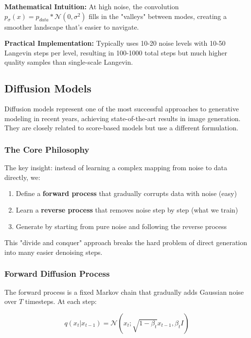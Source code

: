 \documentclass[12pt,a4paper]{article}
\begin{document}
\textbf{Mathematical Intuition:} At high noise, the convolution $p_\sigma(x) = p_{data} * \mathcal{N}(0, \sigma^2)$ fills in the "valleys" between modes, creating a smoother landscape that's easier to navigate.

\textbf{Practical Implementation:} Typically uses 10-20 noise levels with 10-50 Langevin steps per level, resulting in 100-1000 total steps but much higher quality samples than single-scale Langevin.

\subsection{Diffusion Models}

Diffusion models represent one of the most successful approaches to generative modeling in recent years, achieving state-of-the-art results in image generation. They are closely related to score-based models but use a different formulation.

\subsubsection{The Core Philosophy}

The key insight: instead of learning a complex mapping from noise to data directly, we:
\begin{enumerate}
    \item Define a \textbf{forward process} that gradually corrupts data with noise (easy)
    \item Learn a \textbf{reverse process} that removes noise step by step (what we train)
    \item Generate by starting from pure noise and following the reverse process
\end{enumerate}

This "divide and conquer" approach breaks the hard problem of direct generation into many easier denoising steps.

\subsubsection{Forward Diffusion Process}

The forward process is a fixed Markov chain that gradually adds Gaussian noise over $T$ timesteps. At each step:

\begin{equation}
q(x_t | x_{t-1}) = \mathcal{N}(x_t; \sqrt{1-\beta_t}x_{t-1}, \beta_t I)
\end{equation}
\end{document}
